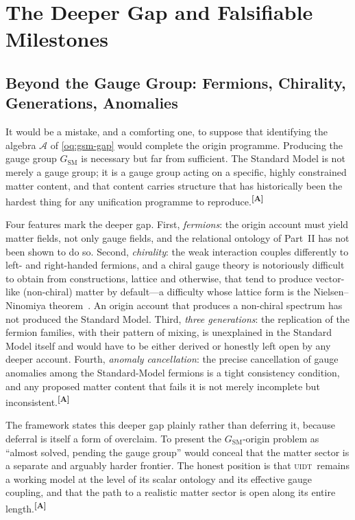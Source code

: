 \documentclass[12pt,a4paper,twoside]{article}
\theoremstyle{plain}
\theoremstyle{definition}
\theoremstyle{remark}
\newcommand{\UIDT}{\textsc{uidt}}
\newcommand{\catmark}[1]{\textsuperscript{\textsf{\textbf{[#1]}}}}
\begin{document}
\newpage
\section{The Deeper Gap and Falsifiable Milestones}
\label{sec:deeper-gap-milestones}

\subsection{Beyond the Gauge Group: Fermions, Chirality, Generations, Anomalies}
\label{subsec:deeper-gap}

It would be a mistake, and a comforting one, to suppose that identifying the algebra $\mathcal{A}$ of \cref{oq:gsm-gap} would complete the origin programme. Producing the gauge group $G_{\mathrm{SM}}$ is necessary but far from sufficient. The Standard Model is not merely a gauge group; it is a gauge group acting on a specific, highly constrained matter content, and that content carries structure that has historically been the hardest thing for any unification programme to reproduce.\catmark{A}

Four features mark the deeper gap. First, \emph{fermions}: the origin account must yield matter fields, not only gauge fields, and the relational ontology of Part~II has not been shown to do so. Second, \emph{chirality}: the weak interaction couples differently to left- and right-handed fermions, and a chiral gauge theory is notoriously difficult to obtain from constructions, lattice and otherwise, that tend to produce vector-like (non-chiral) matter by default---a difficulty whose lattice form is the Nielsen--Ninomiya theorem~\cite{nielsen1981}. An origin account that produces a non-chiral spectrum has not produced the Standard Model. Third, \emph{three generations}: the replication of the fermion families, with their pattern of mixing, is unexplained in the Standard Model itself and would have to be either derived or honestly left open by any deeper account. Fourth, \emph{anomaly cancellation}: the precise cancellation of gauge anomalies among the Standard-Model fermions is a tight consistency condition, and any proposed matter content that fails it is not merely incomplete but inconsistent.\catmark{A}

The framework states this deeper gap plainly rather than deferring it, because deferral is itself a form of overclaim. To present the $G_{\mathrm{SM}}$-origin problem as ``almost solved, pending the gauge group'' would conceal that the matter sector is a separate and arguably harder frontier. The honest position is that \UIDT\ remains a working model at the level of its scalar ontology and its effective gauge coupling, and that the path to a realistic matter sector is open along its entire length.\catmark{A}
\end{document}
